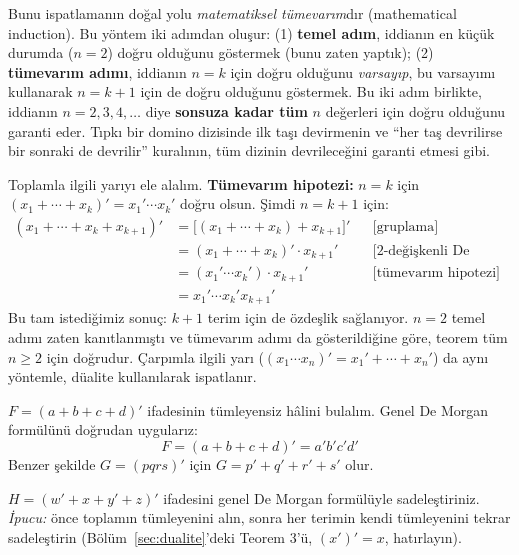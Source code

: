 \begin{bilginot}
Bunu ispatlamanın doğal yolu \emph{matematiksel tümevarım}dır (mathematical induction). Bu
yöntem iki adımdan oluşur: (1) \textbf{temel adım}, iddianın en küçük durumda ($n=2$) doğru
olduğunu göstermek (bunu zaten yaptık); (2) \textbf{tümevarım adımı}, iddianın $n=k$ için
doğru olduğunu \emph{varsayıp}, bu varsayımı kullanarak $n=k+1$ için de doğru olduğunu
göstermek. Bu iki adım birlikte, iddianın $n=2,3,4,\ldots$ diye \textbf{sonsuza kadar tüm}
$n$ değerleri için doğru olduğunu garanti eder. Tıpkı bir domino dizisinde ilk taşı
devirmenin ve ``her taş devrilirse bir sonraki de devrilir'' kuralının, tüm dizinin
devrileceğini garanti etmesi gibi.
\end{bilginot}

\begin{ornek}
Toplamla ilgili yarıyı ele alalım. \textbf{Tümevarım hipotezi:} $n=k$ için
$(x_1+\cdots+x_k)'=x_1'\cdots x_k'$ doğru olsun. Şimdi $n=k+1$ için:
\begin{align*}
(x_1+\cdots+x_k+x_{k+1})' &= \big[(x_1+\cdots+x_k)+x_{k+1}\big]' & &\text{[gruplama]}\\
    &= (x_1+\cdots+x_k)'\cdot x_{k+1}' & &\text{[2-değişkenli De Morgan]}\\
    &= (x_1'\cdots x_k')\cdot x_{k+1}' & &\text{[tümevarım hipotezi]}\\
    &= x_1'\cdots x_k' x_{k+1}'
\end{align*}
Bu tam istediğimiz sonuç: $k+1$ terim için de özdeşlik sağlanıyor. $n=2$ temel adımı zaten
kanıtlanmıştı ve tümevarım adımı da gösterildiğine göre, teorem tüm $n\geq 2$ için doğrudur.
Çarpımla ilgili yarı ($(x_1\cdots x_n)'=x_1'+\cdots+x_n'$) da aynı yöntemle, düalite
kullanılarak ispatlanır.
\end{ornek}

\begin{ornek}
$F=(a+b+c+d)'$ ifadesinin tümleyensiz hâlini bulalım. Genel De Morgan formülünü doğrudan
uygularız:
\[
F=(a+b+c+d)'=a'b'c'd'
\]
Benzer şekilde $G=(pqrs)'$ için $G=p'+q'+r'+s'$ olur.
\end{ornek}

\begin{alistirma}[\orta]
$H=(w'+x+y'+z)'$ ifadesini genel De Morgan formülüyle sadeleştiriniz. \emph{İpucu:}
önce toplamın tümleyenini alın, sonra her terimin kendi tümleyenini tekrar sadeleştirin
(Bölüm~\ref{sec:dualite}'deki Teorem 3'ü, $(x')'=x$, hatırlayın).
\end{alistirma}

